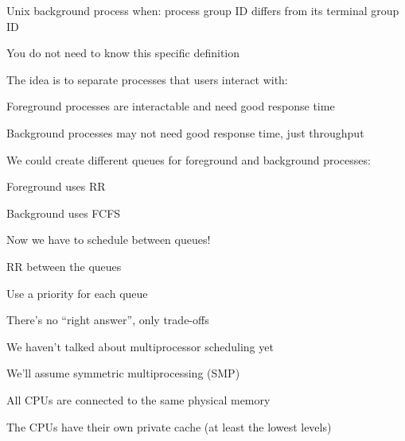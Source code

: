   \begin{slide}


    Unix background process when: process group ID differs from its terminal group ID

    \leftspace{}You do not need to know this specific definition
    \medskip

    The idea is to separate processes that users interact with:

    \leftspace{}Foreground processes are interactable and need good response time

    \leftspace{}Background processes may not need good response time, just throughput

  \end{slide}

  \begin{slide}


    We could create different queues for foreground and background processes:

    \leftspace{}Foreground uses RR

    \leftspace{}Background uses FCFS
    \medskip

    Now we have to schedule between queues!

    \leftspace{}RR between the queues

    \leftspace{}Use a priority for each queue

  \end{slide}

  \begin{slide}


    There's no ``right answer'', only trade-offs
    \medskip

    We haven't talked about multiprocessor scheduling yet
    \medskip

    We'll assume symmetric multiprocessing (SMP)

    \leftspace{}All CPUs are connected to the same physical memory

    \leftspace{}The CPUs have their own private cache (at least the lowest levels)

  \end{slide}

